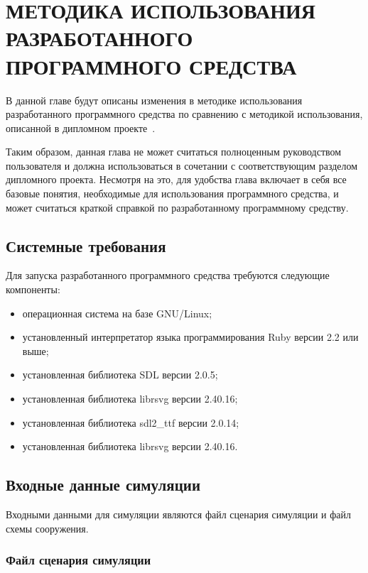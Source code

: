 \chapter{МЕТОДИКА ИСПОЛЬЗОВАНИЯ РАЗРАБОТАННОГО ПРОГРАММНОГО СРЕДСТВА}
\label{sec:manual}

В данной главе будут описаны изменения в методике использования разработанного программного средства по сравнению
с методикой использования, описанной в дипломном проекте~\cite{my_diploma}.

Таким образом, данная глава не может считаться полноценным руководством пользователя и должна
использоваться в сочетании с соответствующим разделом дипломного проекта.
Несмотря на это, для удобства глава включает в себя все базовые понятия, необходимые для использования программного средства,
и может считаться краткой справкой по разработанному программному средству.

\section{Системные требования}
\label{sec:manual:requirements}

Для запуска разработанного программного средства требуются следующие компоненты:
\begin{itemize}
  \item операционная система на базе GNU/Linux;
  \item установленный интерпретатор языка программирования Ruby версии 2.2 или выше;
  \item установленная библиотека SDL версии 2.0.5;
  \item установленная библиотека librsvg версии 2.40.16;
  \item установленная библиотека sdl2\_ttf версии 2.0.14;
  \item установленная библиотека librsvg версии 2.40.16.
\end{itemize}

\section{Входные данные симуляции}
\label{sec:manual:input}

Входными данными для симуляции являются файл сценария симуляции и файл схемы сооружения.

\subsection{Файл сценария симуляции}
\label{sec:manual:input:scenario}

